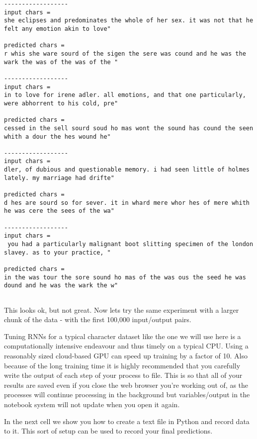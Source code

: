 \documentclass[11pt]{article}
\begin{document}
    \begin{Verbatim}[commandchars=\\\{\}]
------------------
input chars = 
she eclipses and predominates the whole of her sex. it was not that he felt any emotion akin to love"

predicted chars = 
r whis she ware sourd of the sigen the sere was cound and he was the wark the was of the was of the "

------------------
input chars = 
in to love for irene adler. all emotions, and that one particularly, were abhorrent to his cold, pre"

predicted chars = 
cessed in the sell sourd soud ho mas wont the sound has cound the seen whith a dour the hes wound he"

------------------
input chars = 
dler, of dubious and questionable memory. i had seen little of holmes lately. my marriage had drifte"

predicted chars = 
d hes are sourd so for sever. it in whard mere whor hes of mere whith he was cere the sees of the wa"

------------------
input chars = 
 you had a particularly malignant boot slitting specimen of the london slavey. as to your practice, "

predicted chars = 
in the was tour the sore sound ho mas of the was ous the seed he was dound and he was the wark the w"


    \end{Verbatim}

    This looks ok, but not great. Now lets try the same experiment with a
larger chunk of the data - with the first 100,000 input/output pairs.

Tuning RNNs for a typical character dataset like the one we will use
here is a computationally intensive endeavour and thus timely on a
typical CPU. Using a reasonably sized cloud-based GPU can speed up
training by a factor of 10. Also because of the long training time it is
highly recommended that you carefully write the output of each step of
your process to file. This is so that all of your results are saved even
if you close the web browser you're working out of, as the processes
will continue processing in the background but variables/output in the
notebook system will not update when you open it again.

In the next cell we show you how to create a text file in Python and
record data to it. This sort of setup can be used to record your final
predictions.
\end{document}
